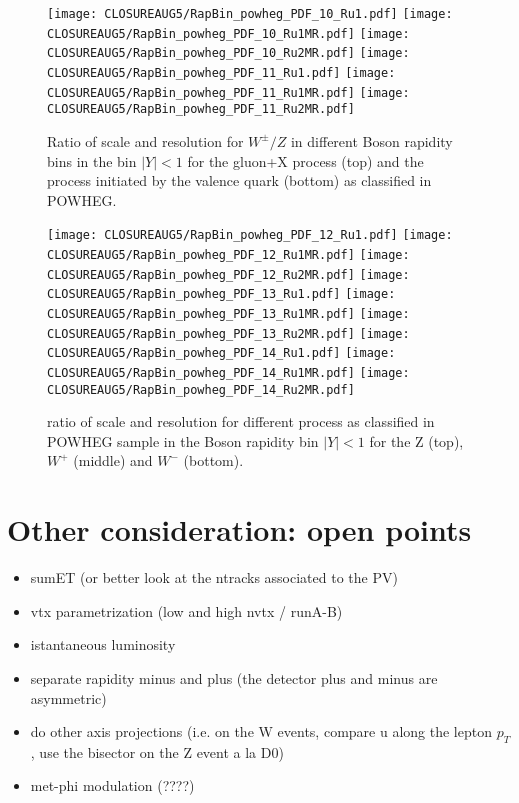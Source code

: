 \documentclass[41pt,a4paper,oneside]{report}
\begin{document}
\begin{figure}[h!]
  \begin{center}
    \texttt{[image: CLOSUREAUG5/RapBin\_powheg\_PDF\_10\_Ru1.pdf]}
    \texttt{[image: CLOSUREAUG5/RapBin\_powheg\_PDF\_10\_Ru1MR.pdf]}
    \texttt{[image: CLOSUREAUG5/RapBin\_powheg\_PDF\_10\_Ru2MR.pdf]}
    \texttt{[image: CLOSUREAUG5/RapBin\_powheg\_PDF\_11\_Ru1.pdf]}
    \texttt{[image: CLOSUREAUG5/RapBin\_powheg\_PDF\_11\_Ru1MR.pdf]}
    \texttt{[image: CLOSUREAUG5/RapBin\_powheg\_PDF\_11\_Ru2MR.pdf]}
    \caption{Ratio of scale and resolution for $W^{\pm}/Z$ in different Boson rapidity bins in the bin $|Y|<1$ for the gluon+X process (top) and the process initiated by the valence quark (bottom) as classified in POWHEG. {\color{blue}{plot oder than OCT6}}}
    \label{fig:iterClosure12}
  \end{center}
  \begin{center}
    \texttt{[image: CLOSUREAUG5/RapBin\_powheg\_PDF\_12\_Ru1.pdf]}
    \texttt{[image: CLOSUREAUG5/RapBin\_powheg\_PDF\_12\_Ru1MR.pdf]}
    \texttt{[image: CLOSUREAUG5/RapBin\_powheg\_PDF\_12\_Ru2MR.pdf]}
    \texttt{[image: CLOSUREAUG5/RapBin\_powheg\_PDF\_13\_Ru1.pdf]}
    \texttt{[image: CLOSUREAUG5/RapBin\_powheg\_PDF\_13\_Ru1MR.pdf]}
    \texttt{[image: CLOSUREAUG5/RapBin\_powheg\_PDF\_13\_Ru2MR.pdf]}
    \texttt{[image: CLOSUREAUG5/RapBin\_powheg\_PDF\_14\_Ru1.pdf]}
    \texttt{[image: CLOSUREAUG5/RapBin\_powheg\_PDF\_14\_Ru1MR.pdf]}
    \texttt{[image: CLOSUREAUG5/RapBin\_powheg\_PDF\_14\_Ru2MR.pdf]}
    \caption{ratio of scale and resolution for different process as classified in POWHEG sample in the Boson rapidity bin $|Y|<1$ for the Z (top), $W^{+}$ (middle) and $W^{-}$ (bottom).{\color{blue}{plot oder than OCT6}} }
    \label{fig:iterClosure13}
  \end{center}
\end{figure}

\newpage

\section{Other consideration: open points}
\begin{itemize}
\item sumET (or better look at the ntracks associated to the PV)
\item vtx parametrization (low and high nvtx / runA-B)
\item istantaneous luminosity
\item separate rapidity minus and plus (the detector plus and minus are asymmetric)
\item do other axis projections (i.e. on the W events, compare u along the lepton $p_{T}$, use the bisector on the Z event a la D0)
\item met-phi modulation (????)
\end{itemize}


\newpage

\end{document}
